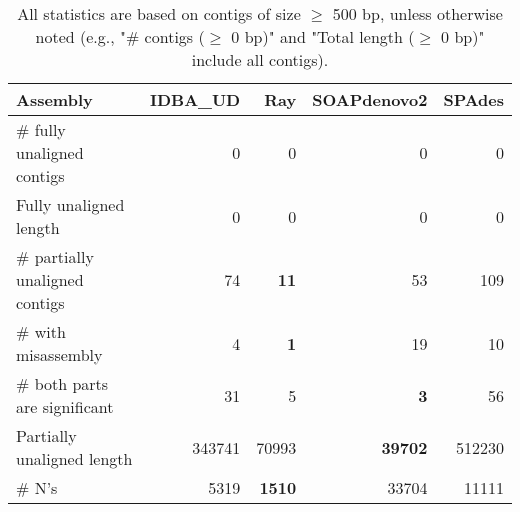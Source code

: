 \documentclass[12pt,a4paper]{article}
\begin{document}
\begin{table}[ht]
\begin{center}
\caption{All statistics are based on contigs of size $\geq$ 500 bp, unless otherwise noted (e.g., "\# contigs ($\geq$ 0 bp)" and "Total length ($\geq$ 0 bp)" include all contigs).}
\begin{tabular}{|l*{4}{|r}|}
\hline
Assembly & IDBA\_UD & Ray & SOAPdenovo2 & SPAdes \\ \hline
\# fully unaligned contigs & 0 & 0 & 0 & 0 \\ \hline
Fully unaligned length & 0 & 0 & 0 & 0 \\ \hline
\# partially unaligned contigs & 74 & {\bf 11} & 53 & 109 \\ \hline
\hspace{5mm}\# with misassembly & 4 & {\bf 1} & 19 & 10 \\ \hline
\hspace{5mm}\# both parts are significant & 31 & 5 & {\bf 3} & 56 \\ \hline
Partially unaligned length & 343741 & 70993 & {\bf 39702} & 512230 \\ \hline
\# N's & 5319 & {\bf 1510} & 33704 & 11111 \\ \hline
\end{tabular}
\end{center}
\end{table}
\end{document}
